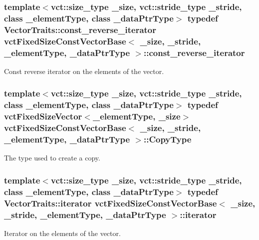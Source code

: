 \subsubsection[{const\+\_\+reverse\+\_\+iterator}]{\setlength{\rightskip}{0pt plus 5cm}template$<$vct\+::size\+\_\+type \+\_\+size, vct\+::stride\+\_\+type \+\_\+stride, class \+\_\+element\+Type, class \+\_\+data\+Ptr\+Type$>$ typedef {\bf Vector\+Traits\+::const\+\_\+reverse\+\_\+iterator} {\bf vct\+Fixed\+Size\+Const\+Vector\+Base}$<$ \+\_\+size, \+\_\+stride, \+\_\+element\+Type, \+\_\+data\+Ptr\+Type $>$\+::{\bf const\+\_\+reverse\+\_\+iterator}}\label{classvct_fixed_size_const_vector_base_acd0a5fe64ff3551c45cebfb2ba81cf10}
Const reverse iterator on the elements of the vector. \hypertarget{classvct_fixed_size_const_vector_base_aaf3accb7cec5765478b5d8fa39c22408}{}
\subsubsection[{Copy\+Type}]{\setlength{\rightskip}{0pt plus 5cm}template$<$vct\+::size\+\_\+type \+\_\+size, vct\+::stride\+\_\+type \+\_\+stride, class \+\_\+element\+Type, class \+\_\+data\+Ptr\+Type$>$ typedef {\bf vct\+Fixed\+Size\+Vector}$<$\+\_\+element\+Type, \+\_\+size$>$ {\bf vct\+Fixed\+Size\+Const\+Vector\+Base}$<$ \+\_\+size, \+\_\+stride, \+\_\+element\+Type, \+\_\+data\+Ptr\+Type $>$\+::{\bf Copy\+Type}}\label{classvct_fixed_size_const_vector_base_aaf3accb7cec5765478b5d8fa39c22408}
The type used to create a copy. \hypertarget{classvct_fixed_size_const_vector_base_ad0ba9b13bb2515695b4e44290bdbaa5d}{}
\subsubsection[{iterator}]{\setlength{\rightskip}{0pt plus 5cm}template$<$vct\+::size\+\_\+type \+\_\+size, vct\+::stride\+\_\+type \+\_\+stride, class \+\_\+element\+Type, class \+\_\+data\+Ptr\+Type$>$ typedef {\bf Vector\+Traits\+::iterator} {\bf vct\+Fixed\+Size\+Const\+Vector\+Base}$<$ \+\_\+size, \+\_\+stride, \+\_\+element\+Type, \+\_\+data\+Ptr\+Type $>$\+::{\bf iterator}}\label{classvct_fixed_size_const_vector_base_ad0ba9b13bb2515695b4e44290bdbaa5d}
Iterator on the elements of the vector. \hypertarget{classvct_fixed_size_const_vector_base_ae22e8ced509e202d00620f384ac3a5b2}{}

